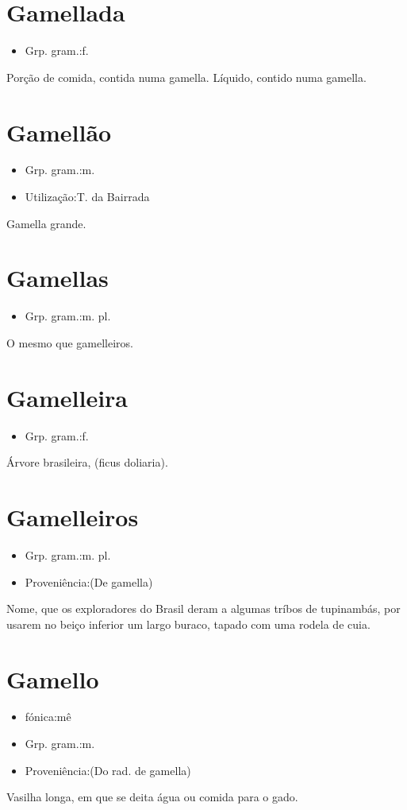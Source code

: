 \section{Gamellada}
\begin{itemize}
\item {Grp. gram.:f.}
\end{itemize}
Porção de comida, contida numa gamella.
Líquido, contido numa gamella.
\section{Gamellão}
\begin{itemize}
\item {Grp. gram.:m.}
\end{itemize}
\begin{itemize}
\item {Utilização:T. da Bairrada}
\end{itemize}
Gamella grande.
\section{Gamellas}
\begin{itemize}
\item {Grp. gram.:m. pl.}
\end{itemize}
O mesmo que \textunderscore gamelleiros\textunderscore .
\section{Gamelleira}
\begin{itemize}
\item {Grp. gram.:f.}
\end{itemize}
Árvore brasileira, (\textunderscore ficus doliaria\textunderscore ).
\section{Gamelleiros}
\begin{itemize}
\item {Grp. gram.:m. pl.}
\end{itemize}
\begin{itemize}
\item {Proveniência:(De \textunderscore gamella\textunderscore )}
\end{itemize}
Nome, que os exploradores do Brasil deram a algumas tríbos de tupinambás, por usarem no beiço inferior um largo buraco, tapado com uma rodela de cuia.
\section{Gamello}
\begin{itemize}
\item {fónica:mê}
\end{itemize}
\begin{itemize}
\item {Grp. gram.:m.}
\end{itemize}
\begin{itemize}
\item {Proveniência:(Do rad. de \textunderscore gamella\textunderscore )}
\end{itemize}
Vasilha longa, em que se deita água ou comida para o gado.
